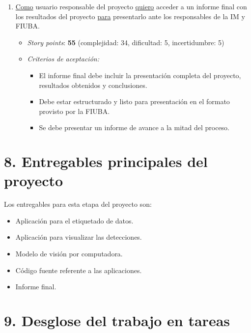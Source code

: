 \documentclass[
11pt, %
]{charter}
\begin{document}
\begin{enumerate}
  \item \underline{Como} usuario responsable del proyecto \underline{quiero} acceder a un informe final con los resultados del proyecto \underline{para} presentarlo ante los responsables de la IM y FIUBA.
        \begin{itemize}
          \item \textit{Story points}: \textbf{55} (complejidad: 34, dificultad: 5, incertidumbre: 5)
          \item \textit{Criterios de aceptación:}
                \begin{itemize}
                  \item El informe final debe incluir la presentación completa del proyecto, resultados obtenidos y conclusiones.
                  \item Debe estar estructurado y listo para presentación en el formato provisto por la FIUBA.
                  \item Se debe presentar un informe de avance a la mitad del proceso.
                \end{itemize}
        \end{itemize}

\end{enumerate}

\section{8. Entregables principales del proyecto}
\label{sec:entregables}

Los entregables para esta etapa del proyecto son:

\begin{itemize}
  \item Aplicación para el etiquetado de datos.
  \item Aplicación para visualizar las detecciones.
  \item Modelo de visión por computadora.
  \item Código fuente referente a las aplicaciones.
  \item Informe final.
\end{itemize}

\section{9. Desglose del trabajo en tareas}
\label{sec:wbs}
\end{document}
